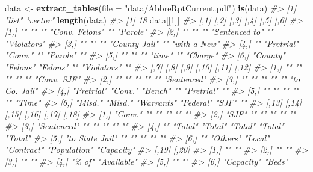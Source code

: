 \documentclass[
  12pt,
]{book}
\newenvironment{Shaded}{\begin{snugshade}}{\end{snugshade}}
\newcommand{\CommentTok}[1]{\textcolor[rgb]{0.37,0.37,0.37}{\textit{#1}}}
\newcommand{\DataTypeTok}[1]{\textcolor[rgb]{0.27,0.27,0.27}{#1}}
\newcommand{\DecValTok}[1]{\textcolor[rgb]{0.06,0.06,0.06}{#1}}
\newcommand{\KeywordTok}[1]{\textcolor[rgb]{0.27,0.27,0.27}{\textbf{#1}}}
\newcommand{\NormalTok}[1]{#1}
\newcommand{\StringTok}[1]{\textcolor[rgb]{0.5,0.5,0.5}{#1}}
\begin{document}
\begin{Shaded}
\begin{Highlighting}[]
\NormalTok{data <{-}}\StringTok{ }\KeywordTok{extract\_tables}\NormalTok{(}\DataTypeTok{file =} \StringTok{"data/AbbreRptCurrent.pdf"}\NormalTok{)}
\KeywordTok{is}\NormalTok{(data)}
\CommentTok{\#> [1] "list"   "vector"}
\KeywordTok{length}\NormalTok{(data)}
\CommentTok{\#> [1] 18}
\NormalTok{data[[}\DecValTok{1}\NormalTok{]]}
\CommentTok{\#>      [,1]     [,2]       [,3]     [,4]           [,5]        [,6]        }
\CommentTok{\#> [1,] ""       ""         ""       "Conv. Felons" ""          "Parole"    }
\CommentTok{\#> [2,] ""       ""         ""       "Sentenced to" ""          "Violators" }
\CommentTok{\#> [3,] ""       ""         ""       "County Jail"  ""          "with a New"}
\CommentTok{\#> [4,] ""       "Pretrial" "Conv."  ""             "Parole"    ""          }
\CommentTok{\#> [5,] ""       ""         ""       "time"         ""          "Charge"    }
\CommentTok{\#> [6,] "County" "Felons"   "Felons" ""             "Violators" ""          }
\CommentTok{\#>      [,7]       [,8]    [,9]       [,10]     [,11]      [,12]        }
\CommentTok{\#> [1,] ""         ""      ""         ""        ""         "Conv. SJF"  }
\CommentTok{\#> [2,] ""         ""      ""         ""        ""         "Sentenced"  }
\CommentTok{\#> [3,] ""         ""      ""         ""        ""         "to Co. Jail"}
\CommentTok{\#> [4,] "Pretrial" "Conv." "Bench"    ""        "Pretrial" ""           }
\CommentTok{\#> [5,] ""         ""      ""         ""        ""         "Time"       }
\CommentTok{\#> [6,] "Misd."    "Misd." "Warrants" "Federal" "SJF"      ""           }
\CommentTok{\#>      [,13]           [,14]    [,15]   [,16]      [,17]        [,18]     }
\CommentTok{\#> [1,] "Conv."         ""       ""      ""         ""           ""        }
\CommentTok{\#> [2,] "SJF"           ""       ""      ""         ""           ""        }
\CommentTok{\#> [3,] "Sentenced"     ""       ""      ""         ""           ""        }
\CommentTok{\#> [4,] ""              "Total"  "Total" "Total"    "Total"      "Total"   }
\CommentTok{\#> [5,] "to State Jail" ""       ""      ""         ""           ""        }
\CommentTok{\#> [6,] ""              "Others" "Local" "Contract" "Population" "Capacity"}
\CommentTok{\#>      [,19]      [,20]      }
\CommentTok{\#> [1,] ""         ""         }
\CommentTok{\#> [2,] ""         ""         }
\CommentTok{\#> [3,] ""         ""         }
\CommentTok{\#> [4,] "\% of"     "Available"}
\CommentTok{\#> [5,] ""         ""         }
\CommentTok{\#> [6,] "Capacity" "Beds"}

\end{Highlighting}
\end{Shaded}
\end{document}
